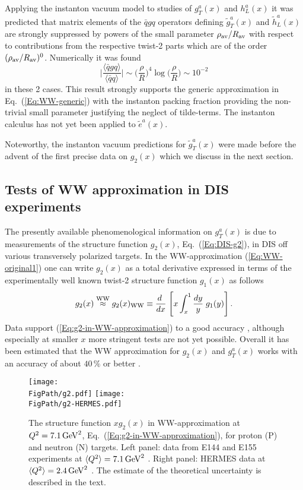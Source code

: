 \documentclass[a4paper,11pt]{article}
\newcommand{\be}{\begin{equation}}
\newcommand{\ee}{\end{equation}}
\newcommand{\la}{\langle}
\newcommand{\ra}{\rangle}
\newcommand*{\FigPath}{./figs}%
\begin{document}
Applying the instanton vacuum model to studies of $g_T^a(x)$ and $h_L^a(x)$
it was predicted that matrix elements of the $\bar qgq$ operators defining 
$\tilde{g}_T^a(x)$ \cite{Balla:1997hf} and $\tilde{h}_L^a(x)$ 
\cite{Dressler:1999hc} are strongly suppressed by powers of the small
parameter $\rho_{\rm av}/R_{\rm av}$ with respect to contributions from the 
respective twist-2 parts which are of the order $(\rho_{\rm av}/R_{\rm av})^0$. 
Numerically it was found 
\be\label{Eq:WW-instanoton}
	\biggl|\frac{\la\bar{q}gq\ra}{\la\bar{q}q\ra}\biggr| \sim 
	\biggl(\frac{\rho}{R}\biggr)^{\!4} \log\biggl(\frac{\rho}{R}\biggr)
	\sim 10^{-2}
\ee
in these 2 cases. This result strongly supports the generic approximation
in Eq.~(\ref{Eq:WW-generic}) with the instanton packing fraction providing 
the non-trivial small parameter justifying the neglect of tilde-terms. 
The instanton calculus has not yet been applied to $\tilde{e}^a(x)$.

Noteworthy, the instanton vacuum predictions for $\tilde{g}_T^a(x)$
\cite{Balla:1997hf}
were made before the advent of the first precise data on $g_2(x)$
which we discuss in the next section.

\newpage
\subsection{Tests of WW approximation in DIS experiments}
\label{Sec-3.4:WW-classic-experiment}

The presently available phenomenological information on $g_T^a(x)$ is due 
to measurements of the structure function $g_2(x)$, Eq.~(\ref{Eq:DIS-g2}),
in DIS off various transversely polarized targets. In the WW-approximation 
(\ref{Eq:WW-original1}) one can write $g_2(x)$ as a total derivative
expressed in terms of the experimentally well known twist-2
structure function $g_1(x)$ as follows
\be
    	g_2(x) \stackrel{\rm WW}{\approx} g_2(x)_{\rm WW} \equiv
	\frac{ d\;}{ d x}\;\Biggl[x\int_x^1\frac{ d y}{y}
	\;g_1(y)\Biggr]\,.\label{Eq:g2-in-WW-approximation}
\ee
Data support (\ref{Eq:g2-in-WW-approximation}) to a good accuracy
\cite{Anthony:2002hy,Abe:1998wq,Airapetian:2011wu}, although especially 
at smaller $x$ more stringent tests are not yet possible. Overall it has 
been estimated that the WW approximation for $g_2(x)$ and $g_T^a(x)$ works 
with an accuracy of about $40\,\%$ or better \cite{Accardi:2009au}. 

\begin{figure}[b!]
\centering
\texttt{[image: \\FigPath/g2.pdf]} 
\texttt{[image: \\FigPath/g2-HERMES.pdf]} 
\caption{\label{Fig:g2} 
The structure function $xg_2(x)$ in WW-approximation at $Q^2=7.1\,{\rm GeV}^2$,
Eq.~(\ref{Eq:g2-in-WW-approximation}), for proton (P) and neutron (N) targets. 
Left panel: data from E144 and E155 experiments at $\la Q^2\ra=7.1\,{\rm GeV}^2$ \cite{Anthony:2002hy,Abe:1998wq}. Right panel: HERMES data 
at $\la Q^2\ra=2.4\,{\rm GeV}^2$ \cite{Airapetian:2011wu}.
The estimate of the theoretical uncertainty is described in the text.}
\end{figure}
\end{document}
